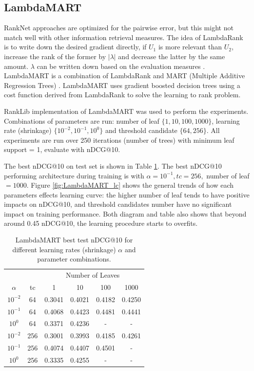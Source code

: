 \documentclass[english]{article}
\theoremstyle{definition}
\begin{document}
\begin{multicols}{2}
\subsection{LambdaMART}

RankNet approaches are optimized for the pairwise error, but this might not match well with other information retrieval measures. The idea of LambdaRank is to write down the desired gradient directly, if $U_1$ is more relevant than $U_2$, increase the rank of the former by $|\lambda|$ and decrease the latter by the same amount. $\lambda$ can be written down based on the evaluation measures \cite{burges2010ranknet}. 
LambdaMART is a combination of LambdaRank and MART (Multiple Additive Regression Trees) \cite{mart}. LambdaMART uses gradient boosted decision trees using a cost function derived from LambdaRank to solve the learning to rank problem.


RankLib \cite{Lemur} implementation of LambdaMART was used to perform the experiments. Combinations of parameters are run: number of leaf $\{1,10,100,1000\}$, learning rate (shrinkage) $\{10^{-2}, 10^{-1}, 10^{0}\}$ and threshold candidate $\{64,256\}$. All experiments are run over 250 iterations (number of trees) with minimum leaf support = 1, evaluate with nDCG@10.

The best nDCG@10 on test set is shown in Table \ref{tab:LambdaMART_train}. The best nDCG@10 performing architecture during training is with $\alpha = 10^{-1}, tc = 256,$ number of leaf $= 1000$. Figure \ref{fig:LambdaMART_lc} shows the general trends of how each parameters effects learning curve: the higher number of leaf tends to have positive impacts on nDCG@10, and threshold candidates number have no significant impact on training performance. Both diagram and table also shows that beyond around 0.45 nDCG@10, the learning procedure starts to overfits. 

\begin{table}[H]
\begin{center}
\begin{tabular}{c c c c c c}
  \hline
  {} & {} & \multicolumn{4}{c}{Number of Leaves}\\
  $\alpha$ & tc & 1 & 10 & 100 & 1000\\
  \hline
  $10^{-2}$ & 64 & 0.3041 & 0.4021 & 0.4182 & 0.4250 \\
  $10^{-1}$ & 64 & 0.4068 & 0.4423 & 0.4481 & 0.4441 \\
  $10^{0}$ & 64 & 0.3371 & 0.4236 & - & - \\
  \hline
  $10^{-2}$ & 256 & 0.3001 & 0.3993 & 0.4185 & 0.4261 \\
  $10^{-1}$ & 256 & 0.4074 & 0.4407 & 0.4501 & - \\
  $10^{0}$ & 256 & 0.3335 & 0.4255 & - & - \\
  \hline
\end{tabular}
\caption{\label{tab:LambdaMART_train}LambdaMART best test nDCG@10 for different learning rates (shrinkage) $\alpha$ and parameter combinations.}
\end{center}
\end{table}


\end{multicols}
\end{document}
